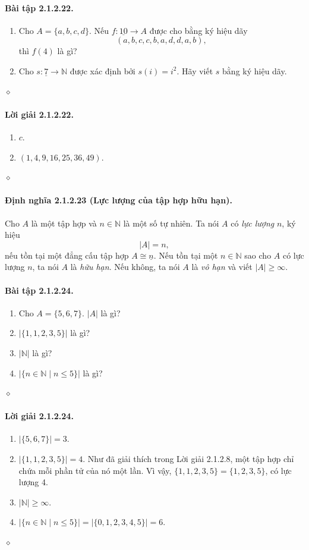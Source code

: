\paragraph{Bài tập 2.1.2.22.}
\begin{enumerate}[label=\alph*.]
\item Cho $A=\{a,b,c,d\}$. Nếu $f:\underline{10}\to A$ được cho bằng ký hiệu dãy
\[(a,b,c,c,b,a,d,d,a,b),\]
thì $f(4)$ là gì?
\item Cho $s:\underline7\to\mathbb N$ được xác định bởi $s(i)=i^2$. Hãy viết $s$ bằng ký hiệu dãy.
\end{enumerate}\hfill$\diamond$
\paragraph{Lời giải 2.1.2.22.}
\begin{enumerate}[label=\alph*.]\item $c$.\item $(1,4,9,16,25,36,49)$.\end{enumerate}\hfill$\diamond$
\paragraph{Định nghĩa 2.1.2.23 (Lực lượng của tập hợp hữu hạn).} Cho $A$ là một tập hợp và $n\in\mathbb N$ là một số tự nhiên. Ta nói $A$ có \emph{lực lượng} $n$, ký hiệu
\[|A|=n,\]
nếu tồn tại một đẳng cấu tập hợp $A\cong\underline n$. Nếu tồn tại một $n\in\mathbb N$ sao cho $A$ có lực lượng $n$, ta nói $A$ là \emph{hữu hạn}. Nếu không, ta nói $A$ là \emph{vô hạn} và viết $|A|\geq\infty$.
\paragraph{Bài tập 2.1.2.24.}
\begin{enumerate}[label=\alph*.]\item Cho $A=\{5,6,7\}$. $|A|$ là gì?\item $|\{1,1,2,3,5\}|$ là gì?\item $|\mathbb N|$ là gì?\item $|\{n\in\mathbb N\mid n\leq5\}|$ là gì?\end{enumerate}\hfill$\diamond$
\paragraph{Lời giải 2.1.2.24.}
\begin{enumerate}[label=\alph*.]
\item $|\{5,6,7\}|=3$.
\item $|\{1,1,2,3,5\}|=4$. Như đã giải thích trong Lời giải 2.1.2.8, một tập hợp chỉ chứa mỗi phần tử của nó một lần. Vì vậy, $\{1,1,2,3,5\}=\{1,2,3,5\}$, có lực lượng 4.
\item $|\mathbb N|\geq\infty$.
\item $|\{n\in\mathbb N\mid n\leq5\}|=|\{0,1,2,3,4,5\}|=6$.
\end{enumerate}\hfill$\diamond$


